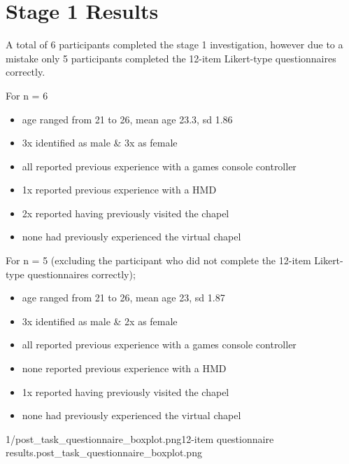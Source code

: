 
\section{Stage 1 Results}

A total of 6 participants completed the stage 1 investigation, however due to a mistake only 5 participants completed the 12-item Likert-type questionnaires correctly.

For n = 6
\begin{itemize}
	\item age ranged from 21 to 26, mean age 23.3, sd 1.86
	\item 3x identified as male \& 3x as female
	\item all reported previous experience with a games console controller
	\item 1x reported previous experience with a HMD
	\item 2x reported having previously visited the chapel
	\item none had previously experienced the virtual chapel
\end{itemize}

For n = 5 (excluding the participant who did not complete the 12-item Likert-type questionnaires correctly);
\begin{itemize}
	\item age ranged from 21 to 26, mean age 23, sd 1.87
	\item 3x identified as male \& 2x as female
	\item all reported previous experience with a games console controller
	\item none reported previous experience with a HMD
	\item 1x reported having previously visited the chapel
	\item none had previously experienced the virtual chapel
\end{itemize}

       {1/post_task_questionnaire_boxplot.png}{12-item questionnaire results.}{post_task_questionnaire_boxplot.png}











